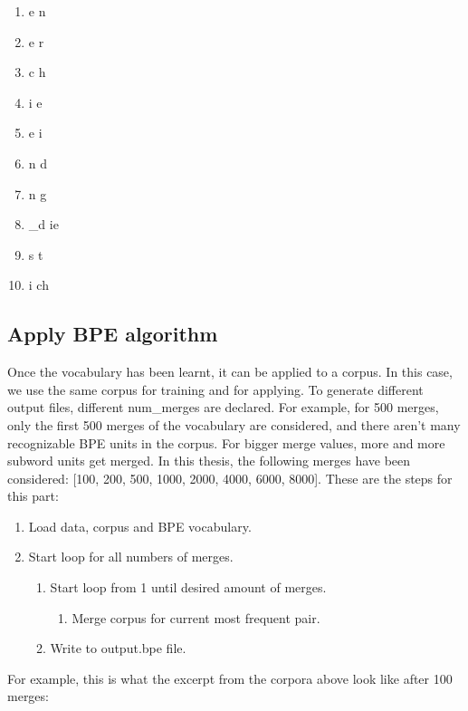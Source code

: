 \begin{enumerate}
	\item e n
	\item e r
	\item c h
	\item i e
	\item e i
	\item n d
	\item n g
	\item \_d ie
	\item s t
	\item i ch
\end{enumerate}

\subsection{Apply BPE algorithm}

Once the vocabulary has been learnt, it can be applied to a corpus. In this case, we use the same corpus for training and for applying. To generate different output files, different num\_merges are declared. For example, for 500 merges, only the first 500 merges of the vocabulary are considered, and there aren't many recognizable BPE units in the corpus. For bigger merge values, more and more subword units get merged. In this thesis, the following merges have been considered: [100, 200, 500, 1000, 2000, 4000, 6000, 8000]. These are the steps for this part:

\begin{enumerate}
	\item Load data, corpus and BPE vocabulary.
	\item Start loop for all numbers of merges.
	\begin{enumerate}
		\item Start loop from 1 until desired amount of merges.
		\begin{enumerate}
			\item Merge corpus for current most frequent pair.
		\end{enumerate}
		\item Write to output.bpe file.
	\end{enumerate}
\end{enumerate}

For example, this is what the excerpt from the corpora above look like after 100 merges:

